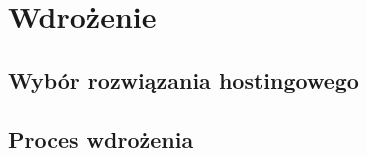%


\sloppy

\chapter{Wdrożenie}
\label{rozdzial5}

\section{Wybór rozwiązania hostingowego}

\section{Proces wdrożenia}
